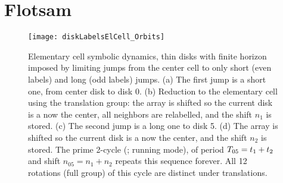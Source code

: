 \section{Flotsam}

\begin{figure}
\begin{center}
\texttt{[image: diskLabelsElCell\_Orbits]}
\end{center}
\caption{
Elementary cell symbolic dynamics, thin disks with  finite horizon
imposed by limiting jumps from the center cell to only short (even
labels) and long (odd labels) jumps.
(a) The first jump is a short one, from center disk to disk 0.
(b) Reduction to the elementary cell using the translation group:
the array is shifted so the current disk is a now the
center, all neighbors are relabelled, and the shift $n_1$
is stored.
(c) The second jump is a long one to disk 5.
(d) The array is shifted so the current disk is a now the center, and the
shift $n_2$ is stored. The prime 2-cycle  (\rpo; running mode),
of period ${T_{05}}=t_1+t_2$ and shift $n_{05} = n_1+n_2$
repeats this sequence forever. All 12 rotations (full  group) of
this cycle are distinct under translations.
    }
\label{diskLabelsElCell}
\end{figure}


